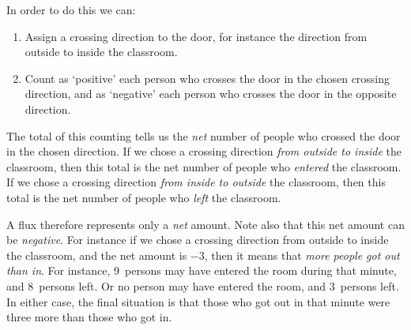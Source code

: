 \documentclass[a4paper,12pt,%
onecolumn,oneside,%
british%
]{memoir}
\renewcommand*{\|}[1][]{\nonscript\:#1\vert\nonscript\:\mathopen{}}
\begin{document}
In order to do this we can:
\begin{enumerate}[label=\arabic*.]
\item Assign a crossing direction to the door, for instance the direction from outside to inside the classroom.
\item Count as \enquote*{positive} each person who crosses the door in the chosen crossing direction, and as \enquote*{negative} each person who crosses the door in the opposite direction.
\end{enumerate}
The total of this counting tells us the \emph{net} number of people who crossed the door in the chosen direction. If we chose a crossing direction \emph{from outside to inside} the classroom, then this total is the net number of people who
\emph{entered} the classroom. If we chose a crossing direction \emph{from inside to outside} the classroom, then this total is the net number of people who
\emph{left} the classroom.

A flux therefore represents only a \emph{net} amount. Note also that this net amount can be \emph{negative}. For instance if we chose a crossing direction from outside to inside the classroom, and the net amount is $\num{-3}$, then it means that \emph{more people got out than in}. For instance, 9~persons may have entered the room during that minute, and 8~persons left. Or no person may have entered the room, and 3~persons left. In either case, the final situation is that those who got out in that minute were three more than those who got in.
\end{document}
